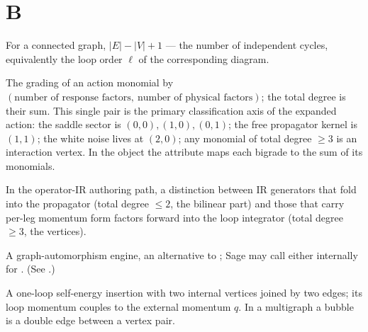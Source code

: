 \section*{B}
\begin{description}[leftmargin=0pt,style=nextline]

  \item[Betti number (first) / loop number] For a connected graph,
        $|E|-|V|+1$ --- the number of independent cycles, equivalently the loop
        order $\ell$ of the corresponding diagram.

  \item[Bigrade $(n_{\tilde{}},\,n_{\mathrm{phys}})$] The grading of an action
        monomial by $(\text{number of response factors},\ \text{number of
        physical factors})$; the total degree is their sum. This single pair is
        the primary classification axis of the expanded action: the saddle sector
        is $(0,0),(1,0),(0,1)$; the free propagator kernel is $(1,1)$; the white
        noise lives at $(2,0)$; any monomial of total degree $\ge 3$ is an
        interaction vertex. In the  object the attribute
         maps each bigrade to the sum of its monomials.

  \item[Bilinear vs vertex generator] In the operator-IR authoring path, a
        distinction between IR generators that fold into the propagator (total
        degree $\le 2$, the bilinear part) and those that carry per-leg momentum
        form factors forward into the loop integrator (total degree $\ge 3$, the
        vertices).

  \item[\code{bliss}] A graph-automorphism engine, an alternative to ;
        Sage may call either internally for . (See
        .)

  \item[Bubble] A one-loop self-energy insertion with two internal vertices joined
        by two edges; its loop momentum couples to the external momentum $q$. In a
        multigraph a bubble is a double edge between a vertex pair.

\end{description}

